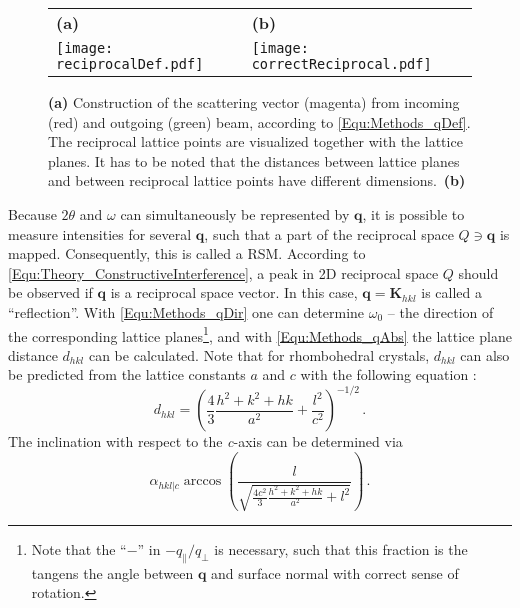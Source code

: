 \begin{figure}
    \centering
    \begin{tabular}{ll}
        \textbf{(a)}&\textbf{(b)}\\
        \texttt{[image: reciprocalDef.pdf]}
        &\texttt{[image: correctReciprocal.pdf]}
    \end{tabular}
    \caption{\textbf{(a)} Construction of the scattering vector (magenta) from incoming (red) and outgoing (green) beam, according to \eqref{Equ:Methods_qDef}.
    The reciprocal lattice points are visualized together with the lattice planes.
    It has to be noted that the distances between lattice planes and between reciprocal lattice points have different dimensions.\ 
    \textbf{(b)}\tbd}
    \label{Fig:Methods_qDef}
\end{figure} 
Because $2\theta$ and $\omega$ can simultaneously be represented by $\mathbf{q}$, it is possible to measure intensities for several $\mathbf{q}$, such that a part of the reciprocal space $Q\ni\mathbf{q}$ is mapped.
Consequently, this is called a \gls{RSM}.
According to \eqref{Equ:Theory_ConstructiveInterference}, a peak in 2D reciprocal space $Q$ should be observed if $\mathbf{q}$ is a reciprocal space vector.
In this case, $\mathbf{q}=\mathbf{K}_{hkl}$ is called a \enquote{reflection}.
With \eqref{Equ:Methods_qDir} one can determine $\omega_0$ -- the direction of the corresponding lattice planes\footnote{
    Note that the \enquote{$-$} in $-q_\parallel/q_\perp$ is necessary, such that this fraction is the tangens the angle between $\mathbf{q}$ and surface normal with correct sense of rotation. 
}, and with \eqref{Equ:Methods_qAbs} the lattice plane distance $d_{hkl}$ can be calculated.
Note that for rhombohedral crystals, $d_{hkl}$ can also be predicted from the lattice constants $a$ and $c$ with the following equation \cite{grundmann2018}:
\begin{equation}
    d_{hkl}=\left(
        \frac{4}{3}\frac{h^2+k^2+hk}{a^2}
        +\frac{l^2}{c^2}
    \right)^{-1/2}\,.
    \label{Equ:Methods_dhkl}
\end{equation}
The inclination with respect to the \textit{c}-axis can be determined via \cite{grundmann2020b}
\begin{equation}
    \alpha_{hkl|c}
    \arccos\left(
        \frac{l}{\sqrt{
            \frac{4c^2}{3}\frac{h^2+k^2+hk}{a^2}+l^2
        }}
    \right)\,.
    \label{Equ:Methods_angleWRTc}
\end{equation}


